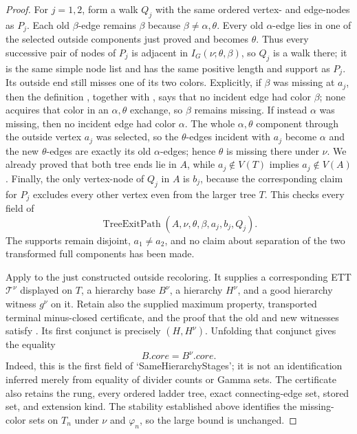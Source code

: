 \begin{proof}
For $j=1,2$, form a walk $Q_j$ with the same ordered vertex- and
edge-nodes as $P_j$.  Each old $\beta$-edge remains $\beta$ because
$\beta\ne\alpha,\theta$.  Every old $\alpha$-edge lies in one of the
selected outside components just proved and becomes $\theta$.  Thus every
successive pair of nodes of $P_j$ is adjacent in
$I_G(\nu;\theta,\beta)$, so $Q_j$ is a walk there; it is the same simple
node list and has the same positive length and support as $P_j$.
Its outside end still misses one of its two colors.  Explicitly, if
$\beta$ was missing at $a_j$, then the definition
, together with , says
that no incident edge had color $\beta$; none acquires that color in an
$\alpha,\theta$ exchange, so $\beta$ remains missing.  If instead
$\alpha$ was missing, then no incident edge had color $\alpha$.  The
whole $\alpha,\theta$ component through the outside vertex $a_j$ was
selected, so the $\theta$-edges incident with $a_j$ become $\alpha$ and
the new $\theta$-edges are exactly its old $\alpha$-edges; hence $\theta$
is missing there under $\nu$.  We already proved that both tree ends lie
in $A$, while $a_j\notin V(T)$ implies $a_j\notin V(A)$.  Finally, the
only vertex-node of $Q_j$ in $A$ is $b_j$, because the corresponding
claim for $P_j$ excludes every other vertex even from the larger tree
$T$.  This checks every field of
\[
       \operatorname{TreeExitPath}(A,\nu,\theta,\beta,a_j,b_j,Q_j).
       \tag{1}
\]
The supports remain disjoint, $a_1\ne a_2$, and no claim about separation
of the two transformed full components has been made.

Apply  to the just constructed outside
recoloring.  It supplies a corresponding ETT $\mathcal T^\nu$ displayed
on $T$, a hierarchy base $B^\nu$, a hierarchy $H^\nu$, and a good
hierarchy witness $g^\nu$ on it.  Retain also the supplied maximum
property, transported terminal minus-closed certificate, and the proof
that the old and new witnesses satisfy
.  Its first conjunct is precisely
$(H,H^\nu)$.  Unfolding that conjunct gives
the equality
\[
                 B.\mathit{core}=B^\nu.\mathit{core}.          \tag{2}
\]
Indeed, this is the first field of `SameHierarchyStages'; it is not an
identification inferred merely from equality of divider counts or Gamma
sets.  The  certificate also
retains the rung, every ordered ladder tree, exact connecting-edge set,
stored set, and extension kind.  The stability established above identifies
the missing-color sets on $T_n$ under $\nu$ and $\varphi_n$, so the large
bound is unchanged.


\end{proof}
